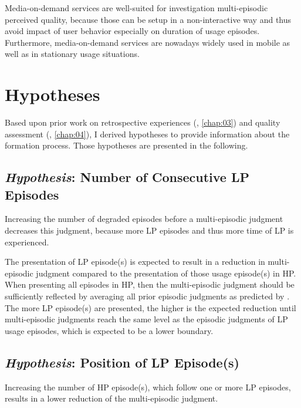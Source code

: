 Media-on-demand services are well-suited for investigation multi-episodic perceived quality, because those can be setup in a non-interactive way and thus avoid impact of user behavior especially on duration of usage episodes.
Furthermore, media-on-demand services are nowadays widely used in mobile as well as in stationary usage situations. 


\section{Hypotheses}
Based upon prior work on retrospective experiences (\cf, \autoref{chap:03}) and quality assessment (\cf, \autoref{chap:04}), I derived \unit[7]{hypotheses} to provide information about the formation process.
Those hypotheses are presented in the following.

\subsection{\emph{Hypothesis}: Number of Consecutive \acl{LP} Episodes}
\begin{hypothesis}\label{hypo:number}
Increasing the number of degraded episodes before a multi-episodic judgment decreases this judgment, because more \ac{LP} episodes and thus more time of \ac{LP} is experienced.
\end{hypothesis}

The presentation of \ac{LP} episode(s) is expected to result in a reduction in multi-episodic judgment compared to the presentation of those usage episode(s) in \ac{HP}.
When presenting all episodes in \ac{HP}, then the multi-episodic judgment should be sufficiently reflected by averaging all prior episodic judgments as predicted by \citet{moller_single-call_2011}.
The more \ac{LP} episode(s) are presented, the higher is the expected reduction until multi-episodic judgments reach the same level as the episodic judgments of \ac{LP} usage episodes, which is expected to be a lower boundary.

\subsection{\emph{Hypothesis}: Position of \acl{LP} Episode(s)}
\begin{hypothesis}\label{hypo:position}
Increasing the number of \ac{HP} episode(s), which follow one or more \ac{LP} episodes, results in a lower reduction of the multi-episodic judgment.
\end{hypothesis}

